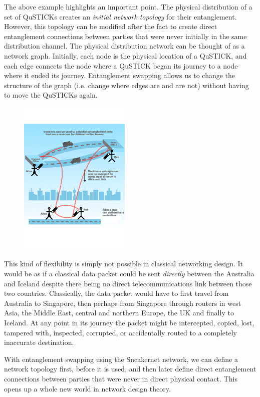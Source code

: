 \documentclass[twocolumn, aps, rmp, amsmath, amssymb, nofootinbib, superscriptaddress, longbibliography, floatfix, table-of-contents, eqsecnum]{revtex4-2}
\begin{document}
The above example highlights an important point. The physical distribution of a set of QuSTICKs creates an \textit{initial network topology} for their entanglement. However, this topology can be modified after the fact to create direct entanglement connections between parties that were never initially in the same distribution channel. The physical distribution network can be thought of as a network graph. Initially, each node is the physical location of a QuSTICK, and each edge connects the node where a QuSTICK began its journey to a node where it ended its journey. Entanglement swapping allows us to change the structure of the graph (i.e. change where edges are and are not) without having to move the QuSTICKs again. 
 
\begin{figure}[htbp!]
	\includegraphics[clip=true, width=0.475\textwidth]{SWAPPING}
	\caption{} \label{fig:SWAPPING}
\end{figure}

This kind of flexibility is simply not possible in classical networking design. It would be as if a classical data packet could be sent \textit{directly} between the Australia and Iceland despite there being no direct telecommunications link between those two countries. Classically, the data packet would have to first travel from Australia to Singapore, then perhaps from Singapore through routers in west Asia, the Middle East, central and northern Europe, the UK and finally to Iceland. At any point in its journey the packet might be intercepted, copied, lost, tampered with, inspected, corrupted, or accidentally routed to a completely inaccurate destination. 

With entanglement swapping using the Sneakernet network, we can define a network topology first, before it is used, and then later define direct entanglement connections between parties that were never in direct physical contact. This opens up a whole new world in network design theory. 
\end{document}

